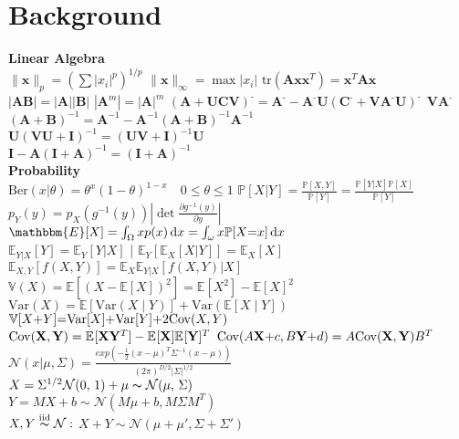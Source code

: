 \section*{Background}
\textbf{Linear Algebra}\\
$\| \mathbf{x} \|_p = \left( \sum |x_i|^p \right)^{1/p}$ \quad $\| \mathbf{x} \|_\infty = \max |x_i|$  
$\text{tr} (\mathbf{A} \mathbf{x} \mathbf{x}^T) = \mathbf{x}^T \mathbf{A} \mathbf{x}$ \\ $| \mathbf{A} \mathbf{B} | = | \mathbf{A} | | \mathbf{B} |$ \quad
$| \mathbf{A}^m | = | \mathbf{A} |^m$ 
$(\mathbf{A} {+} \mathbf{U} \mathbf{C} \mathbf{V})^{\text{-}} {=} \mathbf{A}^{\text{-}} {-} \mathbf{A}^{\text{-}} \mathbf{U} (\mathbf{C}^{\text{-}} {+} \mathbf{V} \mathbf{A}^{\text{-}} \mathbf{U})^{\text{-}} \ \ \mathbf{V} \mathbf{A}^{\text{-}}$ \\
$(\mathbf{A} + \mathbf{B})^{-1} = \mathbf{A}^{-1} - \mathbf{A}^{-1} (\mathbf{A} + \mathbf{B})^{-1} \mathbf{A}^{-1}$ \\
$\mathbf{U} (\mathbf{V} \mathbf{U} + \mathbf{I})^{-1} = (\mathbf{U} \mathbf{V} + \mathbf{I})^{-1} \mathbf{U}$ \\
$\mathbf{I} - \mathbf{A} (\mathbf{I} + \mathbf{A})^{-1} = (\mathbf{I} + \mathbf{A})^{-1}$
\vspace{4px}\\
\textbf{Probability}\\
$\text{Ber}(x|\theta) = \theta^x(1-\theta)^{1-x} \quad 0 \leq \theta \leq 1$
$\mathbb{P}[X|Y]=\frac{\mathbb{P}[X,Y]}{\mathbb{P}[Y]}=\frac{\mathbb{P}[Y|X]\mathbb{P}[X]}{\mathbb{P}[Y]}$ \\
$p_{Y}(y) = p_{X}(g^{-1}(y)) \left| \det \frac{\partial g^{-1}(y)}{\partial y} \right|$
$\mathbbm{E}[X]=\int_{\Omega}xp(x)\di x=\int_{\omega}x\mathbb{P}[X{=}x]\di x$ \\
$\mathbb{E}_{Y|X}[Y]{=}\mathbb{E}_{Y}[Y|X]$ | $\mathbb{E}_{Y}[\mathbb{E}_{X}[X|Y]] {=} \mathbb{E}_{X}[X]$
$\mathbb{E}_{X,Y}[f(X,Y)]=\mathbb{E}_{X}\mathbb{E}_{Y|X}[f(X,Y)|X]$
$\mathbb{V}(X){=}\mathbb{E}[(X{-}\mathbb{E}[X])^2]{=}\mathbb{E}[X^2]{-}\mathbb{E}[X]^2$\\
$\text{Var}(X) {=} \mathbb{E}[\text{Var}(X \mid Y)] {+} \text{Var}(\mathbb{E}[X \mid Y])$  
$\mathbb{V}[X{+}Y]{=}\mathrm{Var}[X]{+}\mathrm{Var}[Y]{+}2\Cov(X, Y)$ \\
$\mathrm{Cov}(\bX ,\bY)=\E[]{\bX \bY^T} - \E[]{\bX }\E[]{\bY}^T$
$\mathrm{Cov}(A\bX{+}c ,B\bY{+}d)=A\mathrm{Cov}(\bX ,\bY)B^T$ 
$\mathcal{N}(x|\mu, \Sigma)= \frac{exp(-\frac{1}{2}(x-\mu)^T\Sigma^{-1}(x-\mu))}{(2\pi)^{D/2}|\Sigma|^{1/2}} $\\
$ X = \Sigma^{1/2} \NNormal + \mu \sampled \Normal{\mu}{\Sigma}$ \\
$ Y = M X {+} b \sim \mathcal{N}(M\mu {+} b, M \Sigma M^T)$ \\
$ X,Y \overset{\mathrm{iid}}{\sampled} \mathcal{N}:$ \quad $X{+}Y \sim \mathcal{N}(\mu {+} \mu', \Sigma {+} \Sigma')$

